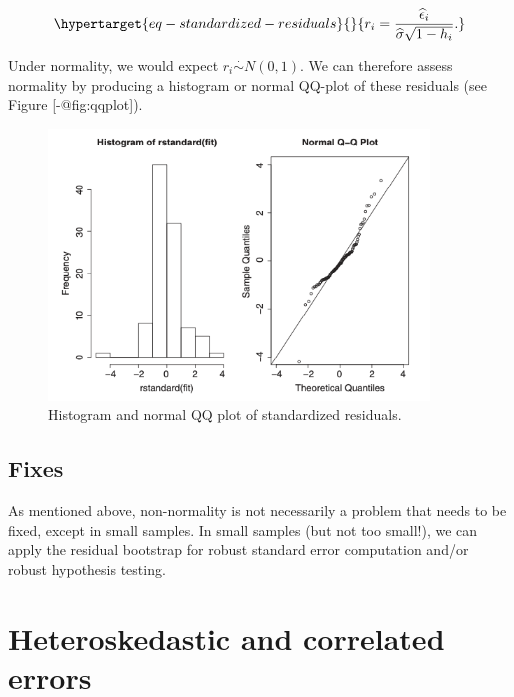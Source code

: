 \documentclass[
  11pt,
  letterpaper,
  oneside]{book}
\theoremstyle{definition}
\theoremstyle{plain}
\theoremstyle{plain}
\theoremstyle{plain}
\theoremstyle{remark}
\begin{document}
\begin{equation}\protect\hypertarget{eq-standardized-residuals}{}{
r_i = \frac{\widehat{\epsilon}_i}{\widehat{\sigma} \sqrt{1-h_i}}.
}\label{eq-standardized-residuals}\end{equation}

Under normality, we would expect \(r_i \overset{\cdot}{\sim} N(0,1)\).
We can therefore assess normality by producing a histogram or normal
QQ-plot of these residuals (see Figure {[}-@fig:qqplot{]}).

\begin{figure}

{\centering \includegraphics[width=0.9\textwidth,height=\textheight]{figures/qqplot.png}

}

\caption{\label{fig-qqplot}Histogram and normal QQ plot of standardized
residuals.}

\end{figure}

\hypertarget{fixes}{%
\subsection{Fixes}\label{fixes}}

As mentioned above, non-normality is not necessarily a problem that
needs to be fixed, except in small samples. In small samples (but not
too small!), we can apply the residual bootstrap for robust standard
error computation and/or robust hypothesis testing.

\hypertarget{sec-heteroskedasticity}{%
\section{Heteroskedastic and correlated
errors}\label{sec-heteroskedasticity}}
\end{document}

